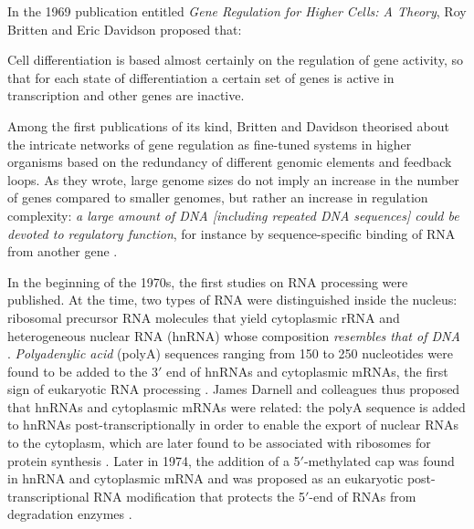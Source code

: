 In the 1969 publication entitled \emph{Gene Regulation for Higher Cells: A Theory}, Roy Britten and Eric Davidson proposed that:

\begin{displayquote}
Cell differentiation is based almost certainly on the regulation of gene activity, so that for each state of differentiation a certain set of genes is active in transcription and other genes are inactive.
\end{displayquote}

Among the first publications of its kind, Britten and Davidson theorised about the intricate networks of gene regulation as fine-tuned systems in higher organisms based on the redundancy of different genomic elements and feedback loops. As they wrote, large genome sizes do not imply an increase in the number of genes compared to smaller genomes, but rather an increase in regulation complexity: \emph{a large amount of DNA [including repeated DNA sequences] could be devoted to regulatory function}, for instance by sequence-specific binding of RNA from another gene \cite{britten:1969va}. 

In the beginning of the 1970s, the first studies on RNA processing were published. At the time, two types of RNA were distinguished inside the nucleus: ribosomal precursor RNA molecules that yield cytoplasmic rRNA and heterogeneous nuclear RNA (hnRNA) whose composition \emph{resembles that of DNA} \cite{darnell:1971tg}. \emph{Polyadenylic acid} (polyA) sequences ranging from 150 to 250 nucleotides were found to be added to the 3$'$ end of hnRNAs and cytoplasmic mRNAs, the first sign of eukaryotic RNA processing \cite{darnell:1971tg,edmonds:1971vr}. James Darnell and colleagues thus proposed that hnRNAs and cytoplasmic mRNAs were related: the polyA sequence is added to hnRNAs post-transcriptionally in order to enable the export of nuclear RNAs to the cytoplasm, which are later found to be associated with ribosomes for protein synthesis \cite{darnell:1971tg,edmonds:1971vr}. Later in 1974, the addition of a 5$'$-methylated cap was found in hnRNA and cytoplasmic mRNA and was proposed as an eukaryotic post-transcriptional RNA modification that protects the 5$'$-end of RNAs from degradation enzymes \cite{perry:1974uj,rottman:1974tk}.



